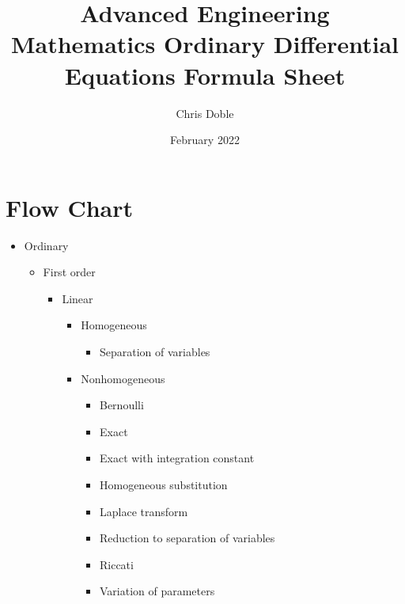 \documentclass{article}
\title{Advanced Engineering Mathematics Ordinary Differential Equations Formula Sheet}
\author{Chris Doble}
\date{February 2022}
\begin{document}
\tableofcontents

\section{Flow Chart}

\begin{itemize}
  \item Ordinary

        \begin{itemize}
          \item First order

                \begin{itemize}
                  \item Linear

                        \begin{itemize}
                          \item Homogeneous

                                \begin{itemize}
                                  \item Separation of variables
                                \end{itemize}

                          \item Nonhomogeneous

                                \begin{itemize}
                                  \item Bernoulli

                                  \item Exact

                                  \item Exact with integration constant

                                  \item Homogeneous substitution

                                  \item Laplace transform

                                  \item Reduction to separation of variables

                                  \item Riccati

                                  \item Variation of parameters
                                \end{itemize}
                        \end{itemize}


\end{itemize}
\end{itemize}
\end{itemize}
\end{document}
